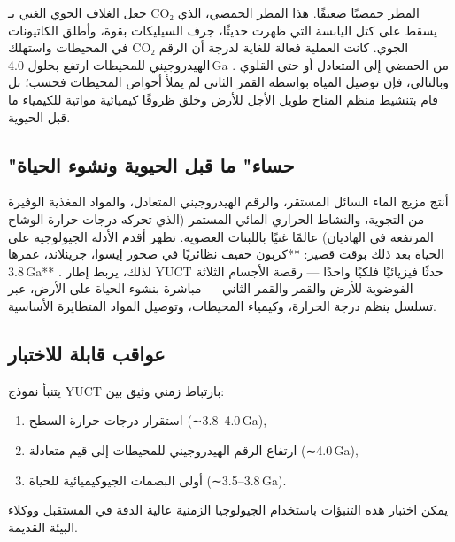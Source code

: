 \documentclass[11pt,a4paper]{article}
\begin{document}
	جعل الغلاف الجوي الغني بـ CO₂ المطر حمضيًا ضعيفًا. هذا المطر الحمضي، الذي يسقط على كتل اليابسة التي ظهرت حديثًا، جرف السيليكات بقوة، وأطلق الكاتيونات في المحيطات واستهلك CO₂ الجوي. كانت العملية فعالة للغاية لدرجة أن الرقم الهيدروجيني للمحيطات ارتفع بحلول 4.0 Ga من الحمضي إلى المتعادل أو حتى القلوي \cite{KrissansenTotton2019}. وبالتالي، فإن توصيل المياه بواسطة القمر الثاني لم يملأ أحواض المحيطات فحسب؛ بل قام بتنشيط منظم المناخ طويل الأجل للأرض وخلق ظروفًا كيميائية مواتية للكيمياء ما قبل الحيوية.
	
	\subsection{"حساء" ما قبل الحيوية ونشوء الحياة}
	
	أنتج مزيج الماء السائل المستقر، والرقم الهيدروجيني المتعادل، والمواد المغذية الوفيرة من التجوية، والنشاط الحراري المائي المستمر (الذي تحركه درجات حرارة الوشاح المرتفعة في الهاديان) عالمًا غنيًا باللبنات العضوية. تظهر أقدم الأدلة الجيولوجية على الحياة بعد ذلك بوقت قصير: **كربون خفيف نظائريًا في صخور إيسوا، جرينلاند، عمرها 3.8 Ga** \cite{Arndt2012}. لذلك، يربط إطار YUCT حدثًا فيزيائيًا فلكيًا واحدًا — رقصة الأجسام الثلاثة الفوضوية للأرض والقمر والقمر الثاني — مباشرة بنشوء الحياة على الأرض، عبر تسلسل ينظم درجة الحرارة، وكيمياء المحيطات، وتوصيل المواد المتطايرة الأساسية.
	
	\subsection{عواقب قابلة للاختبار}
	
	يتنبأ نموذج YUCT بارتباط زمني وثيق بين:
	\begin{enumerate}
		\item استقرار درجات حرارة السطح (∼4.0–3.8 Ga),
		\item ارتفاع الرقم الهيدروجيني للمحيطات إلى قيم متعادلة (∼4.0 Ga),
		\item أولى البصمات الجيوكيميائية للحياة (∼3.8–3.5 Ga).
	\end{enumerate}
	يمكن اختبار هذه التنبؤات باستخدام الجيولوجيا الزمنية عالية الدقة في المستقبل ووكلاء البيئة القديمة.
	
\end{document}
